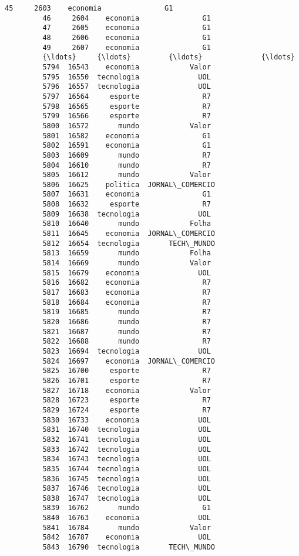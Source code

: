 \documentclass[11pt]{article}
\begin{document}
\begin{Verbatim}[commandchars=\\\{\}]
         45     2603    economia               G1   
         46     2604    economia               G1   
         47     2605    economia               G1   
         48     2606    economia               G1   
         49     2607    economia               G1   
         {\ldots}     {\ldots}         {\ldots}              {\ldots}   
         5794  16543    economia            Valor   
         5795  16550  tecnologia              UOL   
         5796  16557  tecnologia              UOL   
         5797  16564     esporte               R7   
         5798  16565     esporte               R7   
         5799  16566     esporte               R7   
         5800  16572       mundo            Valor   
         5801  16582    economia               G1   
         5802  16591    economia               G1   
         5803  16609       mundo               R7   
         5804  16610       mundo               R7   
         5805  16612       mundo            Valor   
         5806  16625    politica  JORNAL\_COMERCIO   
         5807  16631    economia               G1   
         5808  16632     esporte               R7   
         5809  16638  tecnologia              UOL   
         5810  16640       mundo            Folha   
         5811  16645    economia  JORNAL\_COMERCIO   
         5812  16654  tecnologia       TECH\_MUNDO   
         5813  16659       mundo            Folha   
         5814  16669       mundo            Valor   
         5815  16679    economia              UOL   
         5816  16682    economia               R7   
         5817  16683    economia               R7   
         5818  16684    economia               R7   
         5819  16685       mundo               R7   
         5820  16686       mundo               R7   
         5821  16687       mundo               R7   
         5822  16688       mundo               R7   
         5823  16694  tecnologia              UOL   
         5824  16697    economia  JORNAL\_COMERCIO   
         5825  16700     esporte               R7   
         5826  16701     esporte               R7   
         5827  16718    economia            Valor   
         5828  16723     esporte               R7   
         5829  16724     esporte               R7   
         5830  16733    economia              UOL   
         5831  16740  tecnologia              UOL   
         5832  16741  tecnologia              UOL   
         5833  16742  tecnologia              UOL   
         5834  16743  tecnologia              UOL   
         5835  16744  tecnologia              UOL   
         5836  16745  tecnologia              UOL   
         5837  16746  tecnologia              UOL   
         5838  16747  tecnologia              UOL   
         5839  16762       mundo               G1   
         5840  16763    economia              UOL   
         5841  16784       mundo            Valor   
         5842  16787    economia              UOL   
         5843  16790  tecnologia       TECH\_MUNDO   
         

\end{Verbatim}
\end{document}
